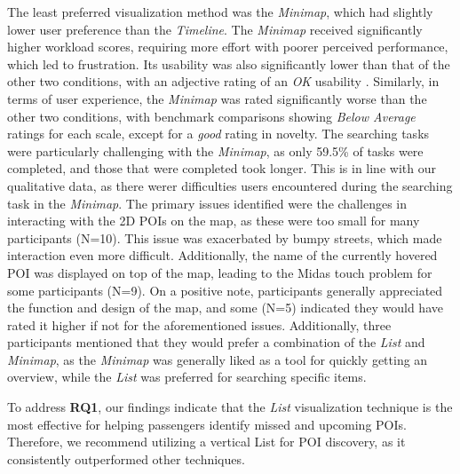 The least preferred visualization method was the \textit{Minimap}, which had slightly lower user preference than the \textit{Timeline}. The \textit{Minimap} received significantly higher workload scores, requiring more effort with poorer perceived performance, which led to frustration. Its usability was also significantly lower than that of the other two conditions, with an adjective rating of an \textit{OK} usability \cite{bangor2009sus}. Similarly, in terms of user experience, the \textit{Minimap} was rated significantly worse than the other two conditions, with benchmark comparisons \cite{schrepp2017construction} showing \textit{Below Average} ratings for each scale, except for a \textit{good} rating in novelty. The searching tasks were particularly challenging with the \textit{Minimap}, as only 59.5\% of tasks were completed, and those that were completed took longer. This is in line with our qualitative data, as there werer difficulties users encountered during the searching task in the \textit{Minimap}. The primary issues identified were the challenges in interacting with the 2D POIs on the map, as these were too small for many participants (N=10). This issue was exacerbated by bumpy streets, which made interaction even more difficult. Additionally, the name of the currently hovered POI was displayed on top of the map, leading to the Midas touch problem for some participants (N=9). On a positive note, participants generally appreciated the function and design of the map, and some (N=5) indicated they would have rated it higher if not for the aforementioned issues. Additionally, three participants mentioned that they would prefer a combination of the \textit{List} and \textit{Minimap}, as the \textit{Minimap} was generally liked as a tool for quickly getting an overview, while the \textit{List} was preferred for searching specific items.

To address \textbf{RQ1}, our findings indicate that the \textit{List} visualization technique is the most effective for helping passengers identify missed and upcoming POIs. Therefore, we recommend utilizing a vertical List for POI discovery, as it consistently outperformed other techniques.


